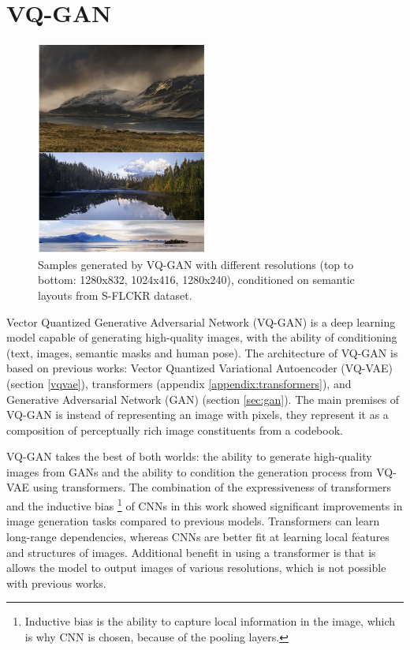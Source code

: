 \section{VQ-GAN}
\label{vqgan}

\begin{figure}
    \centering
    \includegraphics[width=0.5\textwidth]{images/vqgan_samples.png}
    \caption{Samples generated by VQ-GAN with different resolutions (top to bottom: 1280x832, 1024x416, 1280x240), conditioned on semantic layouts from S-FLCKR dataset.}
\end{figure}

Vector Quantized Generative Adversarial Network (VQ-GAN) \cite{vqgan} is a deep learning model capable of generating high-quality images, with the ability of conditioning (text, images, semantic masks and human pose). The architecture of VQ-GAN is based on previous works: Vector Quantized Variational Autoencoder (VQ-VAE) \cite{vqvae} (section \ref{vqvae}), transformers \cite{transformer} (appendix \ref{appendix:transformers}), and Generative Adversarial Network (GAN) \cite{gan} (section \ref{sec:gan}). The main premises of VQ-GAN is instead of representing an image with pixels, they represent it as a composition of perceptually rich image constituents from a codebook.

VQ-GAN takes the best of both worlds: the ability to generate high-quality images from GANs and the ability to condition the generation process from VQ-VAE using transformers. The combination of the expressiveness of transformers and the inductive bias \footnote[1]{Inductive bias is the ability to capture local information in the image, which is why CNN is chosen,  because of the pooling layers.} of CNNs \cite{cnn} in this work showed significant improvements in image generation tasks compared to previous models. Transformers can learn long-range dependencies, whereas CNNs are better fit at learning local features and structures of images. Additional benefit in using a transformer is that is allows the model to output images of various resolutions, which is not possible with previous works.

